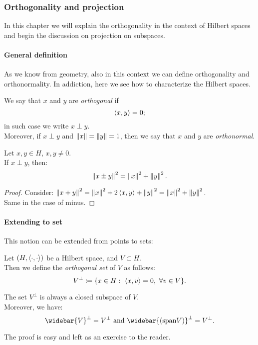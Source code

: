 \subsubsection{Orthogonality and projection}
In this chapter we will explain the orthogonality in the context of Hilbert spaces and begin the discussion on projection on subspaces.

\paragraph{General definition} As we know from geometry, also in this context we can define orthogonality and orthonormality. In addiction, here we see how to characterize the Hilbert spaces.
\begin{defn}
	We say that $x$ and $y$ are \emph{orthogonal} if $$\left\langle x,y\right\rangle = 0;$$
	in such case we write $x \perp y$. \\
	Moreover, if $x \perp y$ and $\left\lVert x\right\rVert=\left\lVert y\right\rVert=1$, then we say that $x$ and $y$ are \emph{orthonormal}.
\end{defn}

\begin{prop}
	Let $x, y \in H$, $x, y \neq 0$.\\
	If $x \perp y$, then:
	$$\left\lVert x\pm y\right\rVert^2 = \left\lVert x\right\rVert^2 +\left\lVert y\right\rVert^2.$$
\end{prop}
\begin{proof}
	Consider:
	$\left\lVert x+y\right\rVert^2 = \left\lVert x\right\rVert^2 + 2\left\langle x,y\right\rangle + \left\lVert y\right\rVert^2 = \left\lVert x\right\rVert^2 +\left\lVert y\right\rVert^2$.\\
	Same in the case of minus.
\end{proof}

\paragraph{Extending to set} This notion can be extended from points to sets:
\begin{defn}
	Let $(H, \left\langle\cdot, \cdot\right\rangle)$ be a Hilbert space, and $V \subset H$.\\
	Then we define the \emph{orthogonal set} of $V$ as follows: 
	$$V^\perp \coloneqq \{x \in H : \ \sca{x,v}=0, \ \forall v \in V\}.$$
\end{defn}

\begin{prop}
	The set $V^\perp$ is always a closed subspace of $V$.\\
	Moreover, we have:
	$$ \widebar{V}^\perp = V^\perp \text{ and } \widebar{(\text{span}V)}^\perp = V^\perp.$$
\end{prop}
The proof is easy and left as an exercise to the reader.

